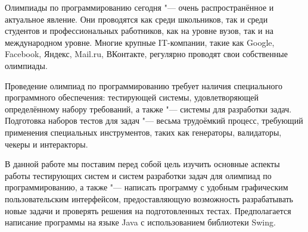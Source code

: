 Олимпиады по программированию сегодня "--- очень распространённое и актуальное явление. Они проводятся как среди школьников, так и среди студентов и профессиональных работников, как на уровне вузов, так и на международном уровне. Многие крупные IT-компании, такие как Google, Facebook, Яндекс, Mail.ru, ВКонтакте, регулярно проводят свои собственные олимпиады.

Проведение олимпиад по программированию требует наличия специального программного обеспечения: тестирующей системы, удовлетворяющей определённому набору требований, а также "--- системы для разработки задач. Подготовка наборов тестов для задач "--- весьма трудоёмкий процесс, требующий применения специальных инструментов, таких как генераторы, валидаторы, чекеры и интеракторы.

В данной работе мы поставим перед собой цель изучить основные аспекты работы тестирующих систем и систем разработки задач для олимпиад по программированию, а также "--- написать программу с удобным графическим пользовательским интерфейсом, предоставляющую возможность разрабатывать новые задачи и проверять решения на подготовленных тестах. Предполагается написание программы на языке Java с использованием библиотеки Swing.



